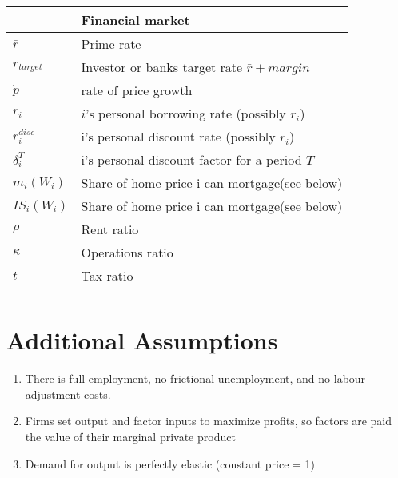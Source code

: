 \begin{longtable}{lp{10cm}}
	& \textbf{Financial market} \\ \hline
$\bar r$     &  Prime rate \\
$r_{target}$ &  Investor or banks target rate $\bar r + margin$ \\
$\dot p$ & rate of price growth\\
$r_i$ & $i$'s personal borrowing rate (possibly $r_i$) \\
$r_i^{disc}$ &  i's personal discount rate (possibly $r_i$) \\
$\delta_i^T$ &  i's personal discount factor for a period $T$ \\
$m_i(W_i)$   &  Share of home price i can mortgage(see below) \\
$IS_i(W_i)$  &  Share of home price i can mortgage(see below) \\
$\rho$       &  Rent ratio \\
$\kappa$     &  Operations ratio \\
$t$          &  Tax ratio \\
\hline
\color{black}
\end{longtable}  

\section{Additional Assumptions}
\begin{enumerate}
\item There is full employment, no frictional unemployment, and no labour adjustment costs.
\item Firms set output and factor inputs to maximize profits, so factors are paid the value of their marginal private product
\item Demand for output is perfectly elastic (constant price = 1)

\end{enumerate}

